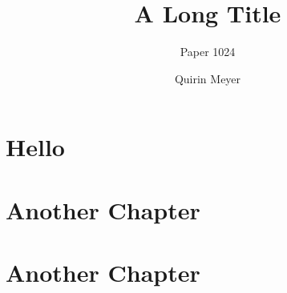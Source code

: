 \documentclass[a4paper]{tufte-book}
\begin{document}
\title{A Long Title}

{
  \author{Paper 1024}  
}
{
\author{Quirin Meyer}
}
\frontmatter
\maketitle
\tableofcontents
\mainmatter
\chapter{Hello}
\begin{figure}[t]
    
\end{figure}


\chapter{Another Chapter}
\chapter{Another Chapter}
\backmatter


\end{document}
